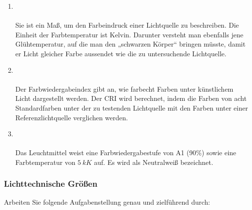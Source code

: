 \begin{enumerate}
    \item   {}\\\\
            Sie ist ein Maß, um den Farbeindruck einer Lichtquelle zu beschreiben. Die Einheit der Farbtemperatur ist Kelvin. Darunter versteht man ebenfalls jene Glühtemperatur, auf die man den „schwarzen Körper“ bringen müsste, damit er Licht gleicher Farbe aussendet wie die zu untersuchende Lichtquelle.


    \item   {}\\\\
            Der Farbwiedergabeindex gibt an, wie farbecht Farben unter künstlichem Licht dargestellt werden.
            Der CRI wird berechnet, indem die Farben von acht Standardfarben unter der zu testenden Lichtquelle mit den Farben unter einer Referenzlichtquelle verglichen werden.

    \item   {}\\\\
            Das Leuchtmittel weist eine Farbwiedergabestufe von A1 (90\%) sowie eine Farbtemperatur von $\SI{5}{kK}$ auf. Es wird als 
            Neutralweiß bezeichnet.
\end{enumerate}

\subsubsection{Lichttechnische Größen}
Arbeiten Sie folgende Aufgabenstellung genau und zielführend durch:

